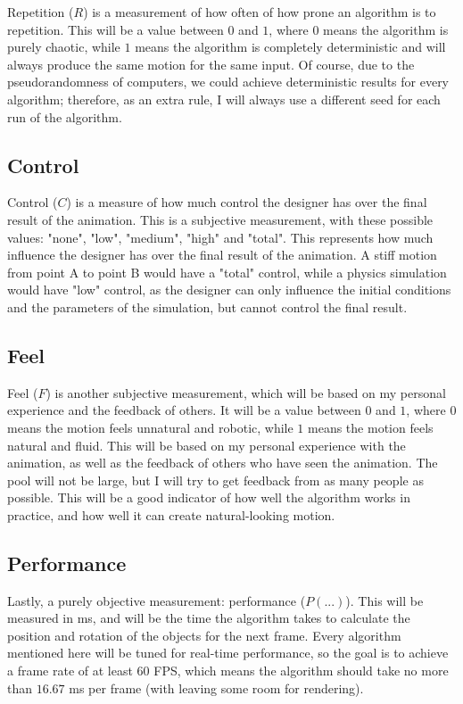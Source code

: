 Repetition (\({R}\)) is a measurement of how often of how prone an algorithm is to repetition. This will be a value between \(0\) and \(1\), where \(0\) means the algorithm is purely chaotic, while \(1\) means the algorithm is completely deterministic and will always produce the same motion for the same input. Of course, due to the pseudorandomness of computers, we could achieve deterministic results for every algorithm; therefore, as an extra rule, I will always use a different seed for each run of the algorithm.

\subsection{Control}
\label{subsec:control}

Control (\({C}\)) is a measure of how much control the designer has over the final result of the animation. This is a subjective measurement, with these possible values: "none", "low", "medium", "high" and "total". This represents how much influence the designer has over the final result of the animation. A stiff motion from point A to point B would have a "total" control, while a physics simulation would have "low" control, as the designer can only influence the initial conditions and the parameters of the simulation, but cannot control the final result.

\subsection{Feel}
\label{subsec:feel}

Feel (\(F\)) is another subjective measurement, which will be based on my personal experience and the feedback of others. It will be a value between \(0\) and \(1\), where \(0\) means the motion feels unnatural and robotic, while \(1\) means the motion feels natural and fluid. This will be based on my personal experience with the animation, as well as the feedback of others who have seen the animation. The pool will not be large, but I will try to get feedback from as many people as possible. This will be a good indicator of how well the algorithm works in practice, and how well it can create natural-looking motion.

\subsection{Performance}
\label{subsec:performance}

Lastly, a purely objective measurement: performance (\(P(...)\)). This will be measured in ms, and will be the time the algorithm takes to calculate the position and rotation of the objects for the next frame. Every algorithm mentioned here will be tuned for real-time performance, so the goal is to achieve a frame rate of at least \(60\) FPS, which means the algorithm should take no more than \(16.67\) ms per frame (with leaving some room for rendering). 

